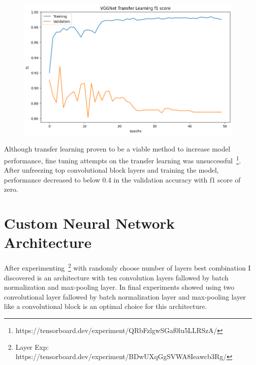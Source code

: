 \begin{figure}[H]
    \centering
    \includegraphics[width=.8\textwidth]{img/vggnettff1.png}
    \caption{}
    \label{fig:vggtff1}
\end{figure}

Although transfer learning proven to be a viable method to increase model performance, fine tuning attempts on the transfer learning was unsuccessful~\footnote{https://tensorboard.dev/experiment/QRbFzlgwSGaf0lu5LLRSzA/}.
After unfreezing top convolutional block layers and training the model, performance decreased to below 0.4 in the validation accuracy with f1 score of zero.

\section{Custom Neural Network Architecture}
After experimenting~\footnote{Layer Exp: https://tensorboard.dev/experiment/BDwUXqGgSVWA8Ieawcb3Rg/} with randomly choose number of layers best combination I discovered is an architecture with ten convolution layers fallowed by batch normalization and max-pooling layer. 
In final experiments showed using two convolutional layer fallowed by batch normalization layer and max-pooling layer like a convolutional block is an optimal choice for this architecture.

